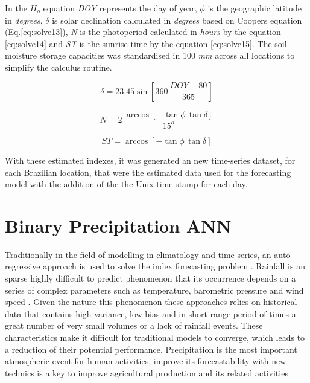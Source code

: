 In the $H_o$ equation \textit{DOY} represents the day of year, $\phi$ is the geographic latitude in \textit{degrees}, $\delta$ is solar declination calculated in \textit{degrees} 
based on Coopers\cite{cooper1969absorption} equation (Eq.\ref{eq:solve13}),
\textit{N} is the photoperiod calculated in \textit{hours} by the equation \ref{eq:solve14} and \textit{ST} is the sunrise time by the equation \ref{eq:solve15}. The soil-moisture storage capacities was standardised in 100 \textit{mm} across all locations to simplify the calculus routine.

\begin{equation}
 \label{eq:solve13}
 \delta = 23.45 \sin[360 \, \frac{DOY - 80}{365}]
\end{equation}

\begin{equation}
\label{eq:solve14}
N = 2 \, \frac{\arccos[-\tan\phi \, \tan\delta]}{15^o} 
\end{equation}

\begin{equation}
\label{eq:solve15}
ST = \arccos[-\tan\phi \, \tan\delta]
\end{equation}

With these estimated indexes, it was generated an new time-series dataset, for each Brazilian location, that were the estimated data used for the forecasting model with the addition of the the Unix time stamp for each day.

\section{Binary Precipitation ANN}
\label{sec:linux}

Traditionally in the field of modelling in climatology and time series, an auto regressive approach is used to solve the index forecasting problem \cite{rajurkar2002artificial, mishra2018rainfall, ramirez2006linear}. Rainfall is an sparse highly difficult to predict phenomenon that its occurrence depends on a series of complex parameters such as temperature, barometric pressure and wind speed \cite{sumi2012rainfall}. Given the nature this phenomenon these approaches relies on historical data that contains high variance, low bias and in short range period of times a great number of very small volumes or a lack of rainfall events. These characteristics make it difficult for traditional models to converge, which leads to a reduction of their potential performance. Precipitation is the most important atmospheric event for human activities, improve its forecastability with new technics is a key to improve agricultural production and its related activities

